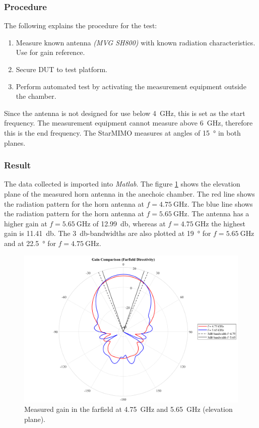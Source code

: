 \subsubsection{Procedure}
The following explains the procedure for the test:
\begin{enumerate}
    \item Measure known antenna \textit{(MVG SH800)} with known radiation characteristics. Use for gain reference.
    \item Secure DUT to test platform.
    \item Perform automated test by activating the measurement equipment outside the chamber.
\end{enumerate}
Since the antenna is not designed for use below \SI{4}{\giga\hertz}, this is set as the start frequency. The measurement equipment cannot measure above \SI{6}{\giga\hertz}, therefore this is the end frequency. The StarMIMO measures at angles of \SI{15}{\degree} in both planes.

\subsubsection{Result}
The data collected is imported into \textit{Matlab}. The figure \ref{fig:horn_elevation} shows the elevation plane of the measured horn antenna in the anechoic chamber. The red line shows the radiation pattern for the horn antenna at $f=\SI{4.75}{\giga\hertz}$. The blue line shows the radiation pattern for the horn antenna at $f=\SI{5.65}{\giga\hertz}$. The antenna has a higher gain at $f=\SI{5.65}{\giga\hertz}$ of \SI{12.99}{\decibel}, whereas at $f=\SI{4.75}{\giga\hertz}$ the highest gain is \SI{11.41}{\decibel}. The \SI{3}{\decibel}-bandwidths are also plotted at \SI{19}{\degree} for $f=\SI{5.65}{\giga\hertz}$ and at \SI{22.5}{\degree} for $f=\SI{4.75}{\giga\hertz}$.
\begin{figure}[H]
    \centering
    \includegraphics[width=1\textwidth]{figures/horn_elevation.png}
    \caption{Measured gain in the farfield at \SI{4.75}{\giga\hertz} and \SI{5.65}{\giga\hertz} (elevation plane).} 
    \label{fig:horn_elevation}
\end{figure}

